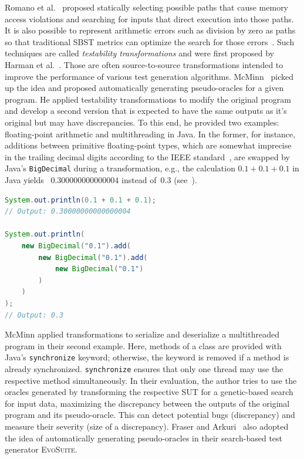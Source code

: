 \documentclass[paper=a4,%
  twoside,%
  BCOR4mm,%
  abstract=true,%
  toc=bibliography,%
  chapterprefix=true,%
  toc=bibliographynumbered,%
  open=right,%
  english,%
  pagesize=pdftex]{scrreprt}
\newcommand{\sut}{\ac{SUT}\xspace}
\newcommand{\todo}[1]{\textbf{TODO: #1}}
\begin{document}
Romano et al.~\cite{Romano2011} proposed statically selecting possible paths that cause memory access violations and searching for inputs that direct execution into those paths. It is also possible to represent arithmetic errors such as division by zero as paths so that traditional \ac{SBST} metrics can optimize the search for those errors~\cite{Bhattacharya2011}. Such techniques are called \emph{testability transformations} and were first
proposed by Harman et al.~\cite{Harman2004}. Those are often source-to-source transformations intended to improve the performance of various test generation algorithms. McMinn~\cite{McMinn2009} picked up the idea and proposed automatically generating pseudo-oracles for a given program. He applied testability transformations to modify the original program and develop a second version that is expected to have the same outputs as it's original but may have discrepancies. To this end, he provided two examples: floating-point arithmetic and multithreading in Java. In the former, for instance, additions between primitive floating-point types, which are somewhat imprecise in the trailing decimal digits according to the IEEE standard~\cite{10.1145/103162.103163}, are swapped by Java's \texttt{BigDecimal} during a transformation, e.g., the calculation $0.1 + 0.1 + 0.1$ in Java yields ~$0.300000000000004$ instead of~$0.3$ (see~).

\begin{lstlisting}[language=Java, style=boxed, caption={Comparing floating-point arithmetic in Java using double compared to \texttt{BigDecimal}~\cite{McMinn2009}}, label=lst:java-transformations]
System.out.println(0.1 + 0.1 + 0.1);
// Output: 0.30000000000000004

System.out.println(
    new BigDecimal("0.1").add(
        new BigDecimal("0.1").add(
            new BigDecimal("0.1")
        )
    )
);
// Output: 0.3
\end{lstlisting}

McMinn applied transformations to serialize and deserialize a multithreaded program in their second example. Here, methods of a class are provided with Java's \texttt{synchronize} keyword; otherwise, the keyword is removed if a method is already synchronized. \texttt{synchronize} ensures that only one thread may use the respective method simultaneously. In their evaluation, the author tries to use the oracles generated by transforming the respective \sut for a genetic-based search for input data, maximizing the discrepancy between the outputs of the original program and its pseudo-oracle. This can detect potential bugs (discrepancy) and measure their severity (size of a discrepancy). Fraser and Arkuri~\cite{Fraser_2013} also adopted the idea of automatically generating pseudo-oracles in their search-based test generator \textsc{EvoSuite}.
\end{document}
